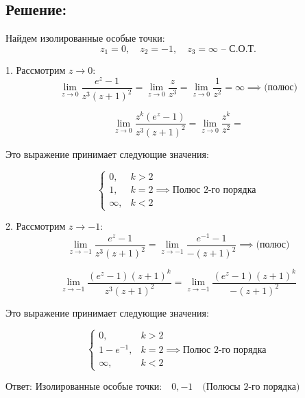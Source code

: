 \documentclass{article}
\begin{document}
\subsection{Решение:}

Найдем изолированные особые точки:
\[
z_1 = 0, \quad z_2 = -1, \quad z_3 = \infty \text{ – С.О.Т.}
\]

1. Рассмотрим $z \to 0$:
\[
\lim_{z \to 0} \frac{e^z - 1}{z^3 (z + 1)^2} = \lim_{z \to 0} \frac{z}{z^3} = \lim_{z \to 0} \frac{1}{z^2} = \infty \implies \text{(полюс)}
\]

\[
\lim_{z \to 0} \frac{z^k(e^z - 1)}{z^3 (z + 1)^2} = \lim_{z \to 0} \frac{z^k}{z^2} =
\]

Это выражение принимает следующие значения:

\[
\begin{cases}
0, & k > 2 \\
1, & k = 2  \implies \text{Полюс 2-го порядка}\\
\infty, & k < 2
\end{cases}
\]

2. Рассмотрим $z \to -1$:
\[
\lim_{z \to -1} \frac{e^z - 1}{z^3 (z + 1)^2} = \lim_{z \to -1} \frac{e^{-1} - 1}{-(z + 1)^2}  \implies \text{(полюс)}
\]

\[
\lim_{z \to -1} \frac{(e^z - 1)(z + 1)^k}{z^3 (z + 1)^2} = \lim_{z \to -1} \frac{(e^z - 1)(z + 1)^k}{-(z + 1)^2}
\]

Это выражение принимает следующие значения:

\[
\begin{cases}
0, & k > 2 \\
1 - e^{-1}, & k = 2  \implies \text{Полюс 2-го порядка} \\
\infty, & k < 2
\end{cases}
\]


Ответ:
$
\text{Изолированные особые точки:} \quad 0, -1 \quad \text{(Полюсы 2-го порядка)}
$
\end{document}
